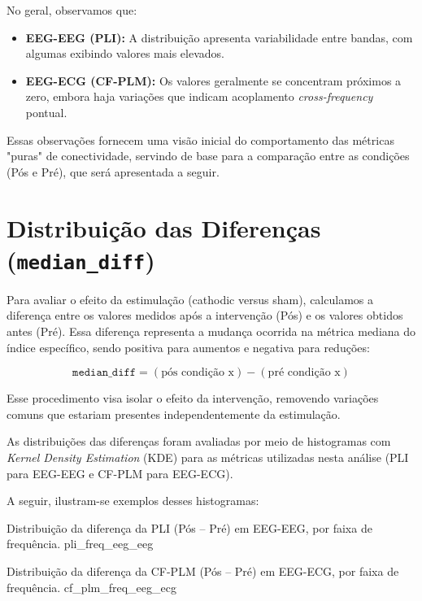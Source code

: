 No geral, observamos que:
\begin{itemize}
    \item \textbf{EEG-EEG (PLI):} A distribuição apresenta variabilidade entre bandas, com algumas exibindo valores mais elevados.
    \item \textbf{EEG-ECG (CF-PLM):} Os valores geralmente se concentram próximos a zero, embora haja variações que indicam acoplamento \emph{cross-frequency} pontual.
\end{itemize}

Essas observações fornecem uma visão inicial do comportamento das métricas "puras" de conectividade, servindo de base para a comparação entre as condições (Pós e Pré), que será apresentada a seguir.

\section{Distribuição das Diferenças (\texttt{median\_diff})}

Para avaliar o efeito da estimulação (cathodic versus sham), calculamos a diferença entre os valores medidos após a intervenção (Pós) e os valores obtidos antes (Pré). Essa diferença representa a mudança ocorrida na métrica mediana do índice específico, sendo positiva para aumentos e negativa para reduções:

\[
\texttt{median\_diff} = (\text{pós condição x}) - (\text{pré condição x})
\]

Esse procedimento visa isolar o efeito da intervenção, removendo variações comuns que estariam presentes independentemente da estimulação.

As distribuições das diferenças foram avaliadas por meio de histogramas com \emph{Kernel Density Estimation} (KDE) para as métricas utilizadas nesta análise (PLI para EEG-EEG e CF-PLM para EEG-ECG).

A seguir, ilustram-se exemplos desses histogramas:

{Distribuição da diferença da PLI (Pós -- Pré) em EEG-EEG, por faixa de frequência.}
{pli_freq_eeg_eeg}

{Distribuição da diferença da CF-PLM (Pós -- Pré) em EEG-ECG, por faixa de frequência.}
{cf_plm_freq_eeg_ecg}

